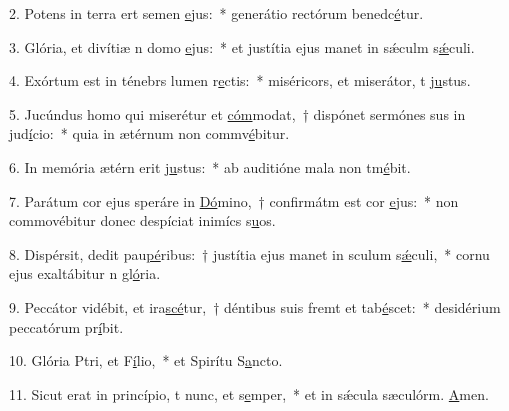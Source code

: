 2. Potens in terra ert semen \uline{e}jus:~* generátio rectórum benedc\uline{é}tur.\par 
3. Glória, et divítiæ n domo \uline{e}jus:~* et justítia ejus manet in sǽculm s\uline{ǽ}culi.\par 
4. Exórtum est in ténebrs lumen r\uline{e}ctis:~* miséricors, et miserátor, t j\uline{u}stus.\par 
5. Jucúndus homo qui miserétur et \uline{cóm}modat,~† dispónet sermónes sus in jud\uline{í}cio:~* quia in ætérnum non commv\uline{é}bitur.\par 
6. In memória ætérn erit j\uline{u}stus:~* ab auditióne mala non tm\uline{é}bit.\par 
7. Parátum cor ejus speráre in \uline{Dó}mino,~† confirmátm est cor \uline{e}jus:~* non commovébitur donec despíciat inimícs s\uline{u}os.\par 
8. Dispérsit, dedit pau\uline{pé}ribus:~† justítia ejus manet in sculum s\uline{ǽ}culi,~* cornu ejus exaltábitur n gl\uline{ó}ria.\par 
9. Peccátor vidébit, et ira\uline{scé}tur,~† déntibus suis fremt et tab\uline{é}scet:~* desidérium peccatórum pr\uline{í}bit.\par 
10. Glória Ptri, et F\uline{í}lio,~* et Spirítu S\uline{a}ncto.\par 
11. Sicut erat in princípio, t nunc, et s\uline{e}mper,~* et in sǽcula sæculórm. \uline{A}men.\par 
